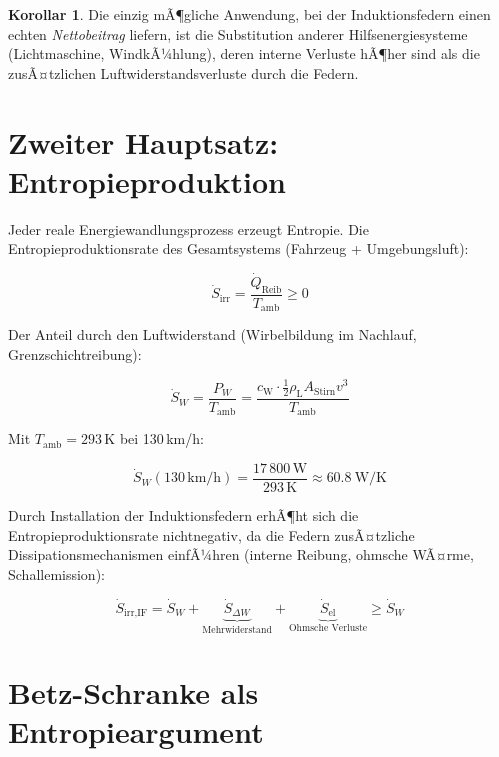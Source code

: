 ﻿\documentclass[12pt, a4paper]{report}
\theoremstyle{definition}
\newtheorem{korollar}[theorem]{Korollar}
\theoremstyle{remark}
\newcommand{\rhoL}{\rho_{\text{L}}}
\newcommand{\cW}{c_{\text{W}}}
\newcommand{\Astirnfl}{A_{\text{Stirn}}}
\begin{document}
\begin{korollar}
  Die einzig mÃ¶gliche Anwendung, bei der Induktionsfedern einen echten
  \emph{Nettobeitrag} liefern, ist die Substitution anderer Hilfsenergiesysteme
  (Lichtmaschine, WindkÃ¼hlung), deren interne Verluste hÃ¶her sind als die
  zusÃ¤tzlichen Luftwiderstandsverluste durch die Federn.
\end{korollar}

\section{Zweiter Hauptsatz: Entropieproduktion}

Jeder reale Energiewandlungsprozess erzeugt Entropie. Die Entropie\-produktions\-rate
des Gesamtsystems (Fahrzeug + Umgebungsluft):

\begin{equation}
  \dot{S}_{\text{irr}} = \frac{\dot{Q}_{\text{Reib}}}{T_{\text{amb}}} \geq 0
  \label{eq:s_irr}
\end{equation}

Der Anteil durch den Luftwiderstand (Wirbelbildung im Nachlauf,
Grenzschichtreibung):

\begin{equation}
  \dot{S}_{W} = \frac{P_W}{T_{\text{amb}}} = \frac{\cW \cdot \frac{1}{2}\rhoL \Astirnfl v^3}{T_{\text{amb}}}
  \label{eq:s_lw}
\end{equation}

Mit $T_{\text{amb}} = 293\,\text{K}$ bei 130\,km/h:

\begin{equation}
  \dot{S}_{W}(130\,\text{km/h}) = \frac{17\,800\,\text{W}}{293\,\text{K}}
  \approx \SI{60.8}{\watt\per\kelvin}
  \label{eq:s_lw_130}
\end{equation}

Durch Installation der Induktionsfedern erhÃ¶ht sich die Entropieproduktionsrate
nicht\-negativ, da die Federn zusÃ¤tzliche Dissipationsmechanismen einfÃ¼hren
(interne Reibung, ohmsche WÃ¤rme, Schallemission):

\begin{equation}
  \dot{S}_{\text{irr,IF}} = \dot{S}_W + \underbrace{\dot{S}_{\Delta W}}_{\text{Mehrwiderstand}}
  + \underbrace{\dot{S}_{\text{el}}}_{\text{Ohmsche Verluste}} \geq \dot{S}_W
  \label{eq:s_irr_if}
\end{equation}

\section{Betz-Schranke als Entropieargument}
\end{document}
